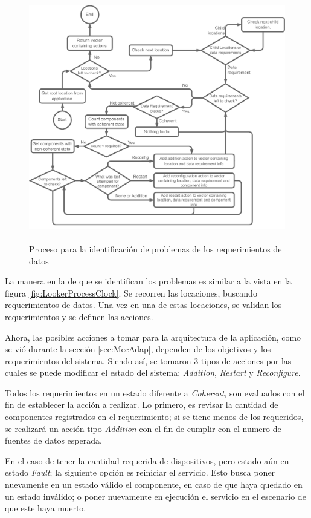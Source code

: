 \begin{figure}[ht]
    \centering
    \caption{\\Proceso para la identificación de problemas de los requerimientos de datos}
    \label{fig:BranProcess}
    \includegraphics[width=0.9\linewidth]{images/BranProcessPlanner.pdf}
\end{figure}

La manera en la de que se identifican los problemas es similar a la vista en la figura \ref{fig:LookerProcessClock}. Se recorren las locaciones, buscando requerimientos de datos. Una vez en una de estas locaciones, se validan los requerimientos y se definen las acciones.

Ahora, las posibles acciones a tomar para la arquitectura de la aplicación, como se vió durante la sección \ref{sec:MecAdap}, dependen de los objetivos y los requerimientos del sistema. Siendo así, se tomaron 3 tipos de acciones por las cuales se puede modificar el estado del sistema: \textit{Addition}, \textit{Restart} y \textit{Reconfigure}.

Todos los requerimientos en un estado diferente a \textit{Coherent}, son evaluados con el fin de establecer la acción a realizar. Lo primero, es revisar la cantidad de componentes registrados en el requerimiento; si se tiene menos de los requeridos, se realizará un acción tipo \textit{Addition} con el fin de cumplir con el numero de fuentes de datos esperada.

En el caso de tener la cantidad requerida de dispositivos, pero estado aún en estado \textit{Fault}; la siguiente opción es reiniciar el servicio. Esto busca poner nuevamente en un estado válido el componente, en caso de que haya quedado en un estado inválido; o poner nuevamente en ejecución el servicio en el escenario de que este haya muerto.

